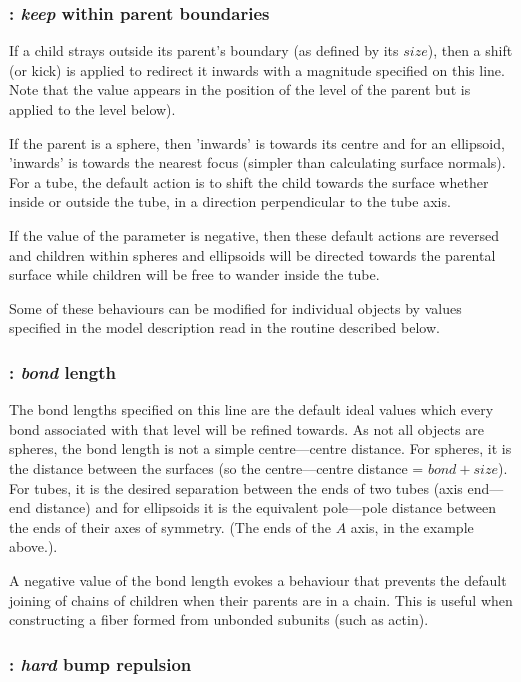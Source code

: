 \subsubsection{: {\em keep} within parent boundaries}

If a child strays outside its parent's boundary (as defined by its $size$), then a shift
(or kick) is applied to redirect it inwards with a magnitude specified on this line.
Note that the value appears in the position of the level of the parent but is applied
to the level below).

If the parent is a sphere, then 'inwards' is towards its centre  and for an ellipsoid,
'inwards' is towards the nearest focus (simpler than calculating surface normals).  For a tube,
the default action is to shift the child towards the surface whether inside or outside
the tube, in a direction perpendicular to the tube axis.

If the value of the parameter is negative, then these default actions are reversed and
children within spheres and ellipsoids will be directed towards the parental surface
while children will be free to wander inside the tube.

Some of these behaviours can be modified for individual objects by values specified in
the model description read in the  routine described below.

\subsubsection{: {\em bond} length}

The bond lengths specified on this line are the default ideal values which every bond
associated with that level will be refined towards.  As not all objects are spheres, the
bond length is not a simple centre---centre distance.   For spheres, it is the distance
between the surfaces (so the centre---centre distance = $bond+size$).  For tubes, it is
the desired separation between the ends of two tubes (axis end---end distance) and for
ellipsoids it is the equivalent pole---pole distance between the ends of their axes of
symmetry.  (The ends of the $A$ axis, in the example above.).

A negative value of the bond length evokes a behaviour that prevents the default joining
of chains of children when their parents are in a chain.  This is 
useful when constructing a fiber formed from unbonded subunits (such as actin).

\subsubsection{: {\em hard} bump repulsion}

